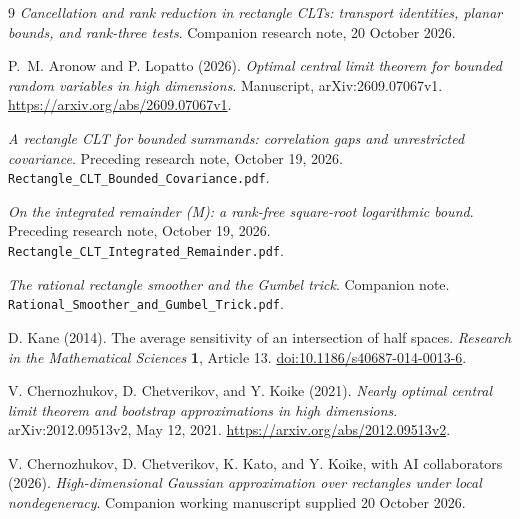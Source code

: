 \documentclass[11pt,a4paper]{article}
\theoremstyle{remark}
\begin{document}
\begin{thebibliography}{9}
\emph{Cancellation and rank reduction in rectangle CLTs:
transport identities, planar bounds, and rank-three tests}.
Companion research note, 20 October 2026.

P.~M. Aronow and P. Lopatto (2026).
\emph{Optimal central limit theorem for bounded random variables in high dimensions}.
Manuscript, arXiv:2609.07067v1.
\url{https://arxiv.org/abs/2609.07067v1}.

\emph{A rectangle CLT for bounded summands: correlation gaps and
unrestricted covariance}.
Preceding research note, October 19, 2026.
\texttt{Rectangle\_CLT\_Bounded\_Covariance.pdf}.

\emph{On the integrated remainder (M): a rank-free square-root
logarithmic bound}.
Preceding research note, October 19, 2026.
\texttt{Rectangle\_CLT\_Integrated\_Remainder.pdf}.

\emph{The rational rectangle smoother and the Gumbel trick}.
Companion note.
\texttt{Rational\_Smoother\_and\_Gumbel\_Trick.pdf}.

D. Kane (2014).
The average sensitivity of an intersection of half spaces.
\emph{Research in the Mathematical Sciences} \textbf{1}, Article 13.
\href{https://doi.org/10.1186/s40687-014-0013-6}{doi:10.1186/s40687-014-0013-6}.

V. Chernozhukov, D. Chetverikov, and Y. Koike (2021).
\emph{Nearly optimal central limit theorem and bootstrap approximations
in high dimensions}.
arXiv:2012.09513v2, May 12, 2021.
\url{https://arxiv.org/abs/2012.09513v2}.

V. Chernozhukov, D. Chetverikov, K. Kato, and Y. Koike,
with AI collaborators (2026).
\emph{High-dimensional Gaussian approximation over rectangles under
local nondegeneracy}. Companion working manuscript supplied
20 October 2026.

\end{thebibliography}
\end{document}
